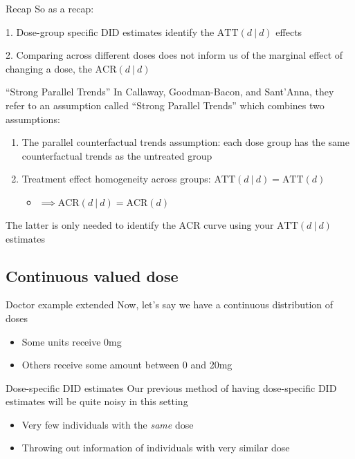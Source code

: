 \documentclass[aspectratio=43,t]{beamer}
\begin{document}
\begin{frame}{Recap}
  So as a recap:

  \bigskip
  {\color{picton-blue} 1.} Dose-group specific DID estimates identify the $\text{ATT}(d \ | \ d)$ effects

  \bigskip
  {\color{picton-blue} 2.} Comparing across different doses does not inform us of the marginal effect of changing a dose, the $\text{ACR}(d \ | \ d)$
\end{frame}

\begin{frame}{``Strong Parallel Trends''}
  In Callaway, Goodman-Bacon, and Sant'Anna, they refer to an assumption called ``Strong Parallel Trends'' which combines two assumptions:
  \begin{enumerate}
    \item The parallel counterfactual trends assumption: each dose group has the same counterfactual trends as the untreated group
    \item Treatment effect homogeneity across groups: $\text{ATT}(d \ | \ d) = \text{ATT}(d)$
    \begin{itemize}
      \item $\implies \text{ACR}(d \ | \ d) = \text{ACR}(d)$
    \end{itemize}
  \end{enumerate}

  \pause
  \bigskip
  The latter is only needed to identify the $\text{ACR}$ curve using your $\text{ATT}(d \ | \ d)$ estimates
\end{frame}


\subsection{Continuous valued dose}

\begin{frame}{Doctor example extended}
  Now, let's say we have a continuous distribution of doses
  \begin{itemize}
    \item Some units receive 0mg
    \item Others receive some amount between 0 and 20mg
  \end{itemize}
\end{frame}


\begin{frame}{Dose-specific DID estimates}
  Our previous method of having dose-specific DID estimates will be quite noisy in this setting
  \begin{itemize}
    \item Very few individuals with the \emph{same} dose

    \item Throwing out information of individuals with very similar dose
  \end{itemize}
\end{frame}
\end{document}
